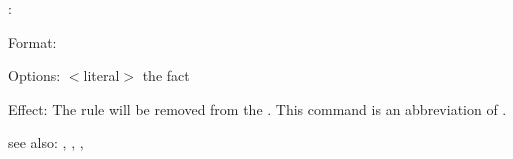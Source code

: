 \rxfact:

Format: 

Options: $<$literal$>$ the fact

Effect: The rule  will be removed from the .
        This command is an abbreviation of .

see also: \rx, \consult, \destroy, \replace
